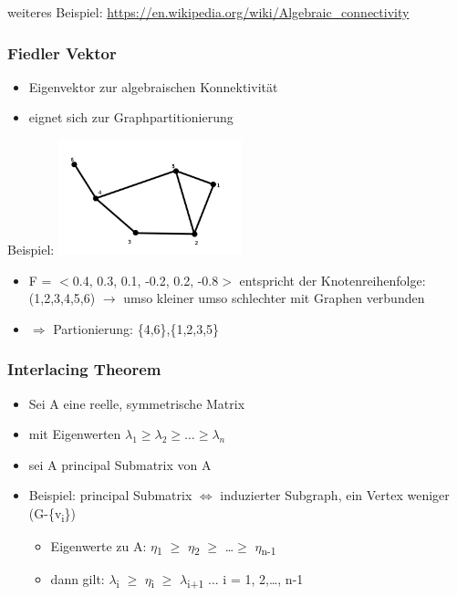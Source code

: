 weiteres Beispiel: \url{https://en.wikipedia.org/wiki/Algebraic_connectivity}

\newpage

\subsubsection{Fiedler Vektor}
\begin{itemize}
	\item Eigenvektor zur algebraischen Konnektivität
	\item eignet sich zur Graphpartitionierung
\end{itemize}

Beispiel:
\includegraphics[width=0.4\textwidth]{lectures/161028/pix/fiedler.png}
\begin{itemize}
	\item F = $<$0.4, 0.3, 0.1, -0.2, 0.2, -0.8$>$ entspricht der Knotenreihenfolge: (1,2,3,4,5,6) $\rightarrow$ umso kleiner umso schlechter mit Graphen verbunden
	\item $\Rightarrow$ Partionierung: \{4,6\},\{1,2,3,5\}\newline
\end{itemize}

\subsubsection{Interlacing Theorem}
\begin{itemize}
	\item Sei A eine reelle, symmetrische Matrix
	\item mit Eigenwerten $\lambda_1 \geq \lambda_2 \geq \ldots \geq \lambda_n$
	\item sei A\grq{} principal Submatrix von A
	\item Beispiel: principal Submatrix $\Leftrightarrow$ induzierter Subgraph, ein Vertex weniger (G-\{v\textsubscript{i}\})
	\begin{itemize}
		\item Eigenwerte zu A\grq{}: $\eta$\textsubscript{1} $\geq$ $\eta$\textsubscript{2} $\geq$ \ldots $\geq$ $\eta$\textsubscript{n-1}
		\item dann gilt: $\lambda$\textsubscript{i} $\geq$ $\eta$\textsubscript{i} $\geq$ $\lambda$\textsubscript{i+1} ... i = 1, 2,\ldots, n-1
	\end{itemize}
\end{itemize}

